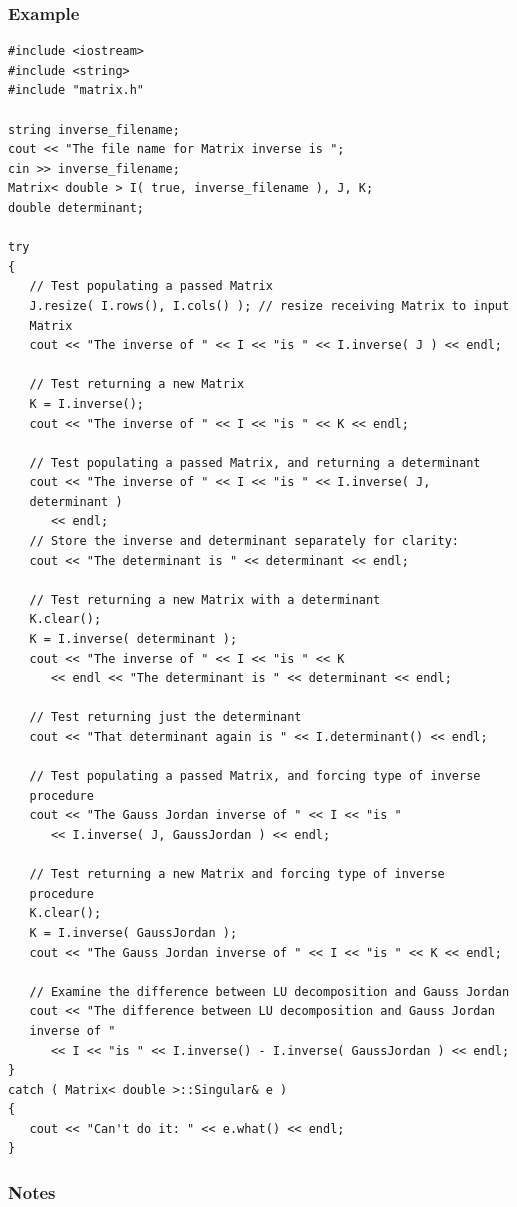 \documentclass{report}
\begin{document}
\subsubsection{Example}
\begin{verbatim}
#include <iostream>
#include <string>
#include "matrix.h"

string inverse_filename;
cout << "The file name for Matrix inverse is ";
cin >> inverse_filename;
Matrix< double > I( true, inverse_filename ), J, K;
double determinant;

try
{
   // Test populating a passed Matrix
   J.resize( I.rows(), I.cols() ); // resize receiving Matrix to input
   Matrix
   cout << "The inverse of " << I << "is " << I.inverse( J ) << endl;

   // Test returning a new Matrix
   K = I.inverse();
   cout << "The inverse of " << I << "is " << K << endl;

   // Test populating a passed Matrix, and returning a determinant
   cout << "The inverse of " << I << "is " << I.inverse( J,
   determinant )
      << endl;
   // Store the inverse and determinant separately for clarity:
   cout << "The determinant is " << determinant << endl;

   // Test returning a new Matrix with a determinant
   K.clear();
   K = I.inverse( determinant );
   cout << "The inverse of " << I << "is " << K
      << endl << "The determinant is " << determinant << endl;

   // Test returning just the determinant
   cout << "That determinant again is " << I.determinant() << endl;

   // Test populating a passed Matrix, and forcing type of inverse
   procedure
   cout << "The Gauss Jordan inverse of " << I << "is "
      << I.inverse( J, GaussJordan ) << endl;

   // Test returning a new Matrix and forcing type of inverse
   procedure
   K.clear();
   K = I.inverse( GaussJordan );
   cout << "The Gauss Jordan inverse of " << I << "is " << K << endl;

   // Examine the difference between LU decomposition and Gauss Jordan
   cout << "The difference between LU decomposition and Gauss Jordan
   inverse of "
      << I << "is " << I.inverse() - I.inverse( GaussJordan ) << endl;
}
catch ( Matrix< double >::Singular& e )
{
   cout << "Can't do it: " << e.what() << endl;
} \end{verbatim}

\subsubsection{Notes}
\end{document}
